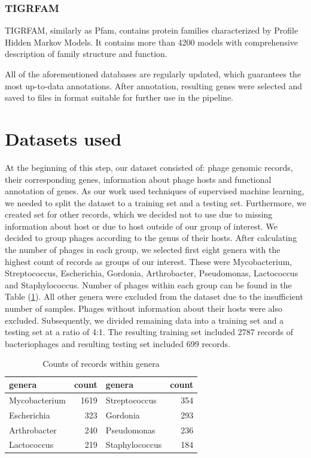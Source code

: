 \subsubsection{TIGRFAM}
TIGRFAM, similarly as Pfam, contains protein families characterized by Profile Hidden Markov Models.
It contains more than 4200 models with comprehensive description of family structure and function.

\vspace{\baselineskip}

All of the aforementioned databases are regularly updated, which guarantees the most up-to-data annotations.
After annotation, resulting genes were selected and saved to files in format suitable for further use in the pipeline.

\section{Datasets used}
At the beginning of this step, our dataset consisted of: phage genomic records, their corresponding genes, information about phage hosts and functional annotation of genes.
As our work used techniques of supervised machine learning, we needed to split the dataset to a training set and a testing set.
Furthermore, we created set for other records, which we decided not to use due to missing information about host or due to host outside of our group of interest.
We decided to group phages according to the genus of their hosts.
After calculating the number of phages in each group, we selected first eight genera with the highest count of records as groups of our interest.
These were Mycobacterium, Streptococcus, Escherichia, Gordonia, Arthrobacter, Pseudomonas, Lactococcus and Staphylococcus.
Number of phages within each group can be found in the Table (\ref{tab:counts}).
All other genera were excluded from the dataset due to the insufficient number of samples.
Phages without information about their hosts were also excluded.
Subsequently, we divided remaining data into a training set and a testing set at a ratio of 4:1.
The resulting training set included 2787 records of bacteriophages and resulting testing set included 699 records.

\begin{table}
 \centering
        \begin{tabular}{ l  r  l  r }
         \hline
         genera & count & genera & count \\
         \hline
         Mycobacterium & 1619 & Streptococcus & 354 \\
         Escherichia & 323 & Gordonia & 293 \\
         Arthrobacter & 240 & Pseudomonas & 236 \\
         Lactococcus & 219 & Staphylococcus & 184 \\
         \hline
        \end{tabular}
        \caption{Counts of records within genera}
        \label{tab:counts}
\end{table}

